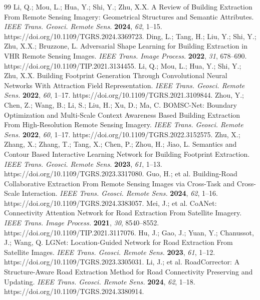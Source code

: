 \begin{thebibliography}{99}
 Li, Q.; Mou, L.; Hua, Y.; Shi, Y.; Zhu, X.X. A Review of Building Extraction From Remote Sensing Imagery: Geometrical Structures and Semantic Attributes. \textit{IEEE Trans. Geosci. Remote Sens.} \textbf{2024}, \textit{62}, 1--15. https://doi.org/10.1109/TGRS.2024.3369723.
 Ding, L.; Tang, H.; Liu, Y.; Shi, Y.; Zhu, X.X.; Bruzzone, L. Adversarial Shape Learning for Building Extraction in VHR Remote Sensing Images. \textit{IEEE Trans. Image Process.} \textbf{2022}, \textit{31}, 678--690. https://doi.org/10.1109/TIP.2021.3134455.
 Li, Q.; Mou, L.; Hua, Y.; Shi, Y.; Zhu, X.X. Building Footprint Generation Through Convolutional Neural Networks With Attraction Field Representation. \textit{IEEE Trans. Geosci. Remote Sens.} \textbf{2022}, \textit{60}, 1--17. https://doi.org/10.1109/TGRS.2021.3109844.
 Zhou, Y.; Chen, Z.; Wang, B.; Li, S.; Liu, H.; Xu, D.; Ma, C. BOMSC-Net: Boundary Optimization and Multi-Scale Context Awareness Based Building Extraction From High-Resolution Remote Sensing Imagery. \textit{IEEE Trans. Geosci. Remote Sens.} \textbf{2022}, \textit{60}, 1--17. https://doi.org/10.1109/TGRS.2022.3152575.
 Zhu, X.; Zhang, X.; Zhang, T.; Tang, X.; Chen, P.; Zhou, H.; Jiao, L. Semantics and Contour Based Interactive Learning Network for Building Footprint Extraction. \textit{IEEE Trans. Geosci. Remote Sens.} \textbf{2023}, \textit{61}, 1--13. https://doi.org/10.1109/TGRS.2023.3317080.
 Guo, H.; et al. Building-Road Collaborative Extraction From Remote Sensing Images via Cross-Task and Cross-Scale Interaction. \textit{IEEE Trans. Geosci. Remote Sens.} \textbf{2024}, \textit{62}, 1--16. https://doi.org/10.1109/TGRS.2024.3383057.
 Mei, J.; et al. CoANet: Connectivity Attention Network for Road Extraction From Satellite Imagery. \textit{IEEE Trans. Image Process.} \textbf{2021}, \textit{30}, 8540--8552. https://doi.org/10.1109/TIP.2021.3117076.
 Hu, J.; Gao, J.; Yuan, Y.; Chanussot, J.; Wang, Q. LGNet: Location-Guided Network for Road Extraction From Satellite Images. \textit{IEEE Trans. Geosci. Remote Sens.} \textbf{2023}, \textit{61}, 1--12. https://doi.org/10.1109/TGRS.2023.3305031.
 Li, J.; et al. RoadCorrector: A Structure-Aware Road Extraction Method for Road Connectivity Preserving and Updating. \textit{IEEE Trans. Geosci. Remote Sens.} \textbf{2024}, \textit{62}, 1--18. https://doi.org/10.1109/TGRS.2024.3380914.

\end{thebibliography}
